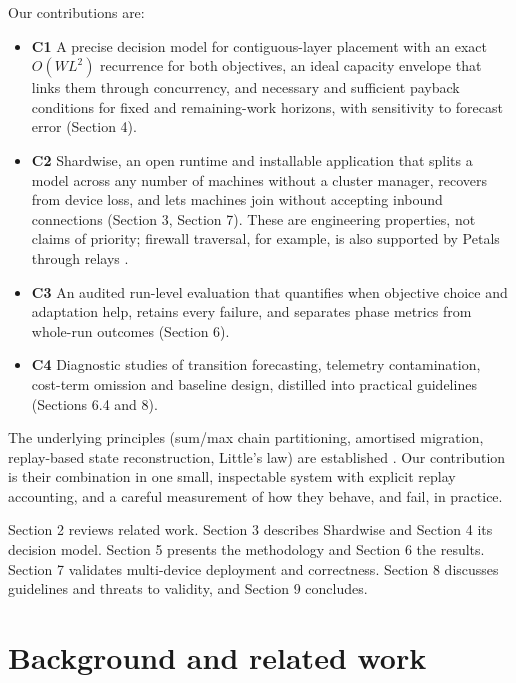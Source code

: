 \documentclass[preprint,12pt]{elsarticle}
\newcommand{\tightlist}{\setlength{\itemsep}{0pt}\setlength{\parskip}{0pt}}
\begin{document}
Our contributions are:

\begin{itemize}
\tightlist
\item
  \textbf{C1} A precise decision model for contiguous-layer placement
  with an exact \(O(WL^2)\) recurrence for both objectives, an ideal
  capacity envelope that links them through concurrency, and necessary
  and sufficient payback conditions for fixed and remaining-work
  horizons, with sensitivity to forecast error (Section 4).
\item
  \textbf{C2} Shardwise, an open runtime and installable application
  that splits a model across any number of machines without a cluster
  manager, recovers from device loss, and lets machines join without
  accepting inbound connections (Section 3, Section 7). These are
  engineering properties, not claims of priority; firewall traversal,
  for example, is also supported by Petals through relays
  \citep{petalsacl2023}.
\item
  \textbf{C3} An audited run-level evaluation that quantifies when
  objective choice and adaptation help, retains every failure, and
  separates phase metrics from whole-run outcomes (Section 6).
\item
  \textbf{C4} Diagnostic studies of transition forecasting, telemetry
  contamination, cost-term omission and baseline design, distilled into
  practical guidelines (Sections 6.4 and 8).
\end{itemize}

The underlying principles (sum/max chain partitioning, amortised
migration, replay-based state reconstruction, Little's law) are
established
\citep{bokhari1988partitioning, pinar2004partitioning, star2026, fu2024serverlessllm, little1961proof}.
Our contribution is their combination in one small, inspectable system
with explicit replay accounting, and a careful measurement of how they
behave, and fail, in practice.

Section 2 reviews related work. Section 3 describes Shardwise and
Section 4 its decision model. Section 5 presents the methodology and
Section 6 the results. Section 7 validates multi-device deployment and
correctness. Section 8 discusses guidelines and threats to validity, and
Section 9 concludes.

\hypertarget{background-and-related-work}{%
\section{Background and related
work}\label{background-and-related-work}}
\end{document}
